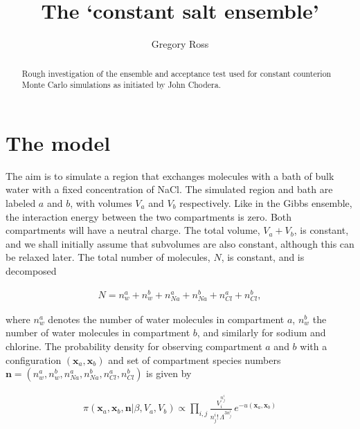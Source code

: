 \documentclass[11pt]{article} %
\title{The `constant salt ensemble'}
\author{Gregory Ross}
\begin{document}
\maketitle

\begin{abstract}
Rough investigation of the ensemble and acceptance test used for constant counterion Monte Carlo simulations as initiated by John Chodera. 
\end{abstract}

\section{The model}

The aim is to simulate a region that exchanges molecules with a bath of bulk water with a fixed concentration of NaCl. The simulated region and bath are labeled $a$ and $b$, with volumes $V_a$ and $V_b$ respectively. Like in the Gibbs ensemble, the interaction energy between the two compartments is zero. Both compartments will have a neutral charge. The total volume, $V_a + V_b$, is constant, and we shall initially assume that subvolumes are also constant, although this can be relaxed later. The total number of molecules, $N$, is constant, and is decomposed 

\begin{align}
N = n_w^a + n_w^b + n_{Na}^a + n_{Na}^b + n_{Cl}^a + n_{Cl}^b,
\end{align}

where $n_w^a$ denotes the number of water molecules in compartment $a$, $n_w^b$ the number of water molecules in compartment $b$, and similarly for sodium and chlorine. The probability density for observing compartment $a$ and $b$ with a configuration $(\mathbf{x}_a,\mathbf{x}_b)$ and set of compartment species numbers $\mathbf{n}=  (n_w^a, n_w^b, n_{Na}^a, n_{Na}^b, n_{Cl}^a, n_{Cl}^b)$ is given by

\begin{align}
\pi(\mathbf{x}_a,\mathbf{x}_b,\mathbf{n}|\beta,V_a,V_b) \propto  \prod_{i,j} \frac{V_i^{n_j^i}}{n^i_j! \, \Lambda^{3n^i_j}}\, e^{-u(\mathbf{x}_a,\mathbf{x}_b)}
\end{align}
\end{document}
